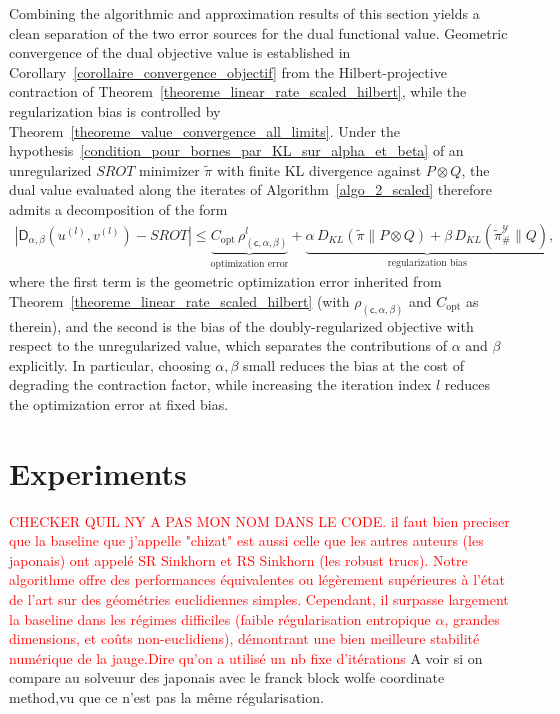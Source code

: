 \documentclass{article}
\begin{document}
Combining the algorithmic and approximation results of this section yields a clean separation of the two error sources for the dual functional value. Geometric convergence of the dual objective value is established in Corollary~\ref{corollaire_convergence_objectif} from the Hilbert-projective contraction of Theorem~\ref{theoreme_linear_rate_scaled_hilbert}, while the regularization bias is controlled by Theorem~\ref{theoreme_value_convergence_all_limits}. Under the hypothesis~\eqref{condition_pour_bornes_par_KL_sur_alpha_et_beta} of an unregularized $SROT$ minimizer $\tilde\pi$ with finite KL divergence against $P\otimes Q$, the dual value evaluated along the iterates of Algorithm~\ref{algo_2_scaled} therefore admits a decomposition of the form
\begin{align}
  |\mathsf{D}_{\alpha,\beta}(u^{(l)}, v^{(l)}) - SROT|
  \leq
  \underbrace{C_{\mathrm{opt}}\, \rho_{(\mathsf{c},\alpha,\beta)}^{l}}_{\text{optimization error}}
  +
  \underbrace{\alpha\, D_{KL}(\tilde\pi \| P\otimes Q) + \beta\, D_{KL}(\tilde\pi^{\mathcal{Y}}_{\#} \| Q)}_{\text{regularization bias}},
\end{align}
where the first term is the geometric optimization error inherited from Theorem~\ref{theoreme_linear_rate_scaled_hilbert} (with $\rho_{(\mathsf{c},\alpha,\beta)}$ and $C_{\mathrm{opt}}$ as therein), and the second is the bias of the doubly-regularized objective with respect to the unregularized value, which separates the contributions of $\alpha$ and $\beta$ explicitly. In particular, choosing $\alpha,\beta$ small reduces the bias at the cost of degrading the contraction factor, while increasing the iteration index $l$ reduces the optimization error at fixed bias.





\section{Experiments}
\label{sec:experiments}
\textcolor{red}{CHECKER QUIL NY A PAS MON NOM DANS LE CODE. il faut bien preciser que la baseline que j'appelle "chizat" est aussi celle que les autres auteurs (les japonais) ont appelé SR Sinkhorn et RS Sinkhorn (les robust trucs). Notre algorithme offre des performances équivalentes ou légèrement supérieures à l'état de l'art sur des géométries euclidiennes simples. Cependant, il surpasse largement la baseline dans les régimes difficiles (faible régularisation entropique $\alpha$, grandes dimensions, et coûts non-euclidiens), démontrant une bien meilleure stabilité numérique de la jauge.Dire qu'on a utilisé un nb fixe d'itérations} A voir si on compare au solveuur des japonais avec le franck block wolfe coordinate method,vu que ce n'est pas la même régularisation. 
\end{document}
